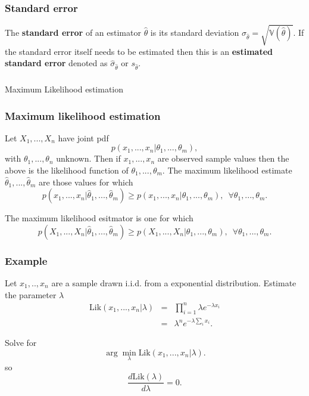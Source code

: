\begin{frame}[fragile]\frametitle{Standard error}

\begin{defn}
The {\bf standard error} of an estimator $\hat{\theta}$ is
its standard deviation $\sigma_{\hat{\theta}} =
\sqrt{\mathbb V(\hat{\theta})}$. If the standard error itself needs 
to be estimated then this is an {\bf estimated standard error}
denoted as $\hat{\sigma}_{\hat{\theta}}$ or
$s_{\hat{\theta}}$.
\end{defn}
\end{frame}

\begin{frame}[fragile]\frametitle{}
\begin{center}
{\Large Maximum Likelihood estimation}

\end{center}
\end{frame}


\begin{frame}[fragile]\frametitle{Maximum likelihood estimation}

\begin{defn}
Let $X_1,...,X_n$ have joint pdf 
$$p(x_1,...,x_n|\theta_1,...,\theta_m),$$
with $\theta_1,...,\theta_n$ unknown.  Then
if $x_1,...,x_n$ are observed sample values
then the above is the likelihood function of
$\theta_1,...,\theta_m$. The maximum likelihood
estimate $\hat{\theta}_1,...,\hat{\theta}_m$
are those values for which
$$p(x_1,...,x_n|\hat{\theta}_1,...,\hat{\theta}_m) \geq p(x_1,...,x_n|\theta_1,...,\theta_m), \, \, \, \forall \theta_1,...,\theta_m.$$

\vspace{.1in}

The maximum likelihood esitmator is one for which
$$p(X_1,...,X_n|\hat{\theta}_1,...,\hat{\theta}_m) \geq p(X_1,...,X_n|\theta_1,...,\theta_m), \, \, \, \forall \theta_1,...,\theta_m.$$

\end{defn}
\end{frame}


\begin{frame}[fragile]\frametitle{Example}

Let $x_1,..,x_n$ are a sample drawn i.i.d. from a exponential distribution.
Estimate the parameter $\lambda$ 
\begin{eqnarray*}
\mbox{Lik}(x_1,...,x_n|\lambda) & =&  \prod_{i=1}^n \lambda e^{-\lambda x_i} \\
 & = & \lambda^n e^{-\lambda \sum_i x_i}.
\end{eqnarray*} 

Solve for 
$$\arg \min_{\lambda} \mbox{Lik}(x_1,...,x_n|\lambda).$$
so
$$\frac{d \mbox{Lik}(\lambda)}{d \lambda} = 0.$$ 

\end{frame}


